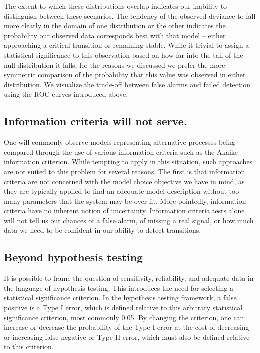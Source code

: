 \documentclass[authoryear,review,11pt]{elsarticle}
\begin{document}
The extent to which these distributions overlap indicates our inability to distinguish between these scenarios.
The tendency of the observed deviance to fall more clearly in the domain of one distribution or the other
indicates the probability our observed data corresponds best with that model  --
either approaching a critical transition or remaining stable.
While it trivial to assign a statistical significance to this observation based
on how far into the tail of the null distribution it falls,
for the reasons we discussed we prefer the more symmetric comparison of the probability that
this value was observed in either distribution.
We visualize the trade-off between false alarms and failed detection using the ROC curves introduced above.


%

\subsection*{Information criteria will not serve.}
One will commonly observe models representing alternative processes being compared through
the use of various information criteria such as the Akaike information criterion.
While tempting to apply in this situation, such approaches are not suited to this problem for several reasons.
The first is that information criteria are not concerned with the model choice objective we have in mind,
as they are typically applied to find an adequate model description without too many parameters that the system may be over-fit.
More pointedly, information criteria have no inherent notion of uncertainty.
Information criteria tests alone will not tell us our chances of a false alarm, of missing a real signal,
or how much data we need to be confident in our ability to detect transitions.

\subsection*{Beyond hypothesis testing}
It is possible to frame the question of sensitivity, reliability, and adequate data in the language of hypothesis testing.
This introduces the need for selecting a statistical significance criterion.
In the hypothesis testing framework, a false positive is a Type I error,
which is defined relative to this arbitrary statistical significance criterion, most commonly 0.05.
By changing the criterion, one can increase or decrease the probability of the Type I error
at the cost of decreasing or increasing false negative or Type II error, which must also be defined relative to this criterion.
\end{document}
